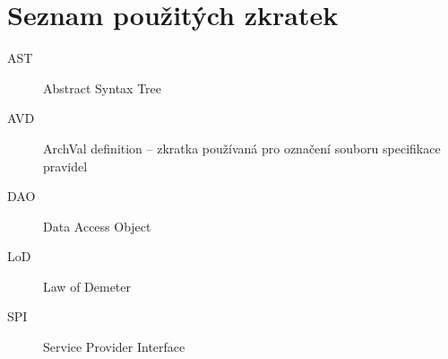 \chapter{Seznam použitých zkratek}

\begin{description}
\item[AST] Abstract Syntax Tree
\item[AVD] ArchVal definition -- zkratka používaná pro označení souboru specifikace pravidel
\item[DAO] Data Access Object
\item[LoD] Law of Demeter
\item[SPI] Service Provider Interface
\end{description}
